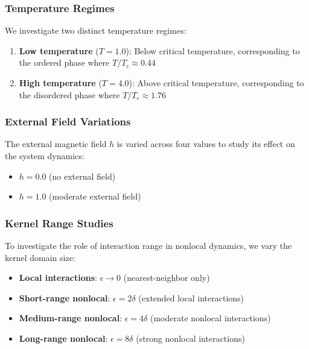 \documentclass[11pt,a4paper]{article}
\begin{document}
\subsubsection{Temperature Regimes}

We investigate two distinct temperature regimes:

\begin{enumerate}
    \item \textbf{Low temperature} ($T = 1.0$): Below critical temperature, corresponding to the ordered phase where $T/T_c \approx 0.44$
    \item \textbf{High temperature} ($T = 4.0$): Above critical temperature, corresponding to the disordered phase where $T/T_c \approx 1.76$
\end{enumerate}

\subsubsection{External Field Variations}

The external magnetic field $h$ is varied across four values to study its effect on the system dynamics:

\begin{itemize}
    \item $h = 0.0$ (no external field)
    \item $h = 1.0$ (moderate external field)
\end{itemize}

\subsubsection{Kernel Range Studies}

To investigate the role of interaction range in nonlocal dynamics, we vary the kernel domain size:

\begin{itemize}
    \item \textbf{Local interactions}: $\epsilon \to 0$ (nearest-neighbor only)
    \item \textbf{Short-range nonlocal}: $\epsilon = 2\delta$ (extended local interactions)
    \item \textbf{Medium-range nonlocal}: $\epsilon = 4\delta$ (moderate nonlocal interactions)
    \item \textbf{Long-range nonlocal}: $\epsilon = 8\delta$ (strong nonlocal interactions)
\end{itemize}
\end{document}
